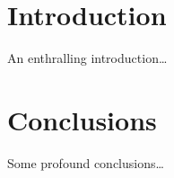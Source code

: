 \documentclass[12pt,phd,lfcs,twoside,openright,logo,rightchapter,normalheadings]{infthesis}
\begin{document}
\begin{preliminary}
\dedication{To everyone}


\setcounter{secnumdepth}{2} %
\setcounter{tocdepth}{1} %
\tableofcontents

\end{preliminary}


\chapter{Introduction}
\label{ch:introduction}
An enthralling introduction\dots

\chapter{Conclusions}
\label{ch:conclusions}
Some profound conclusions\dots


\singlespace
\nocite{*}



\end{document}
